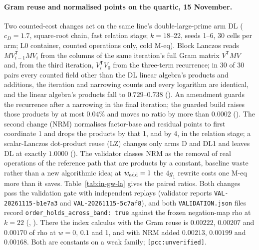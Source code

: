 \paragraph{Gram reuse and normalised points on the quartic, 15 November.}
Two counted-cost changes act on the same line's double-large-prime arm DL
($c_D=1.7$, square-root chain, fast relation stage; $k=18$--22, seeds 1--6,
30 cells per arm; L0 container, counted operations only, cold M-eq). Block
Lanczos reads $MV_{i-1}^{\mathsf T}MV_i$ from the columns of the same
iteration's full Gram matrix $V^{\mathsf T}MV$ and, from the third
iteration, $V_i^{\mathsf T}V_0$ from the three-term recurrence; in 30 of 30
pairs every counted field other than the DL linear algebra's products and
additions, the iteration and narrowing counts and every logarithm are
identical, and the linear algebra's products fall to $0.729$--$0.738$
(). An amendment guards the
recurrence after a narrowing in the final iteration; the guarded build
raises those products by at most $0.04\%$ and moves no ratio by more than
$0.0002$ (). The
second change (NRM) normalises factor-base and residual points to first
coordinate 1 and drops the products by that 1, and by 4, in the relation
stage; a scalar-Lanczos dot-product reuse (LZ) changes only arms D and DL1
and leaves DL at exactly $1.0000$
(). The validator classes
NRM as the removal of real operations of the reference path that are
products by a constant, baseline waste rather than a new algorithmic
idea; at $w_{\rm add}=1$ the $4g_1$ rewrite costs one M-eq more than it
saves. Table~\ref{tab:in-gw-la} gives the paired ratios. Both changes pass
the validation gate with independent replays (validator reports
\texttt{VAL-20261115-b1e7a3} and \texttt{VAL-20261115-5c7af8}), and both
\texttt{VALIDATION.json} files record \texttt{order\_holds\_across\_band:
true} against the frozen negation-map rho at $k=22$
(,
). There the
index calculus with the Gram reuse is $0.00222$, $0.00207$ and $0.00170$ of
rho at $w=0$, $0.1$ and 1, and with NRM added $0.00213$, $0.00199$ and
$0.00168$. Both are constants on a weak family; \texttt{[pcc:unverified]}.

